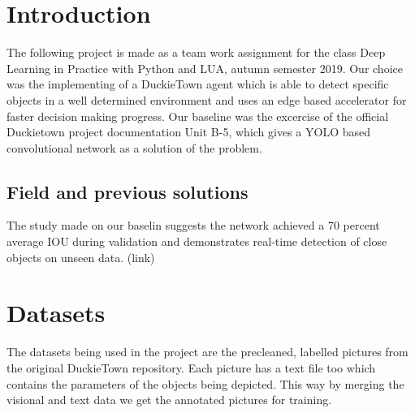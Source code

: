 \documentclass{article}
\begin{document}
\section{Introduction}
The following project is made as a team work assignment for the class Deep Learning in Practice with Python and LUA, autumn semester 2019. Our choice was the implementing of a DuckieTown agent which is able to detect specific objects in a well determined environment and uses an edge based accelerator for faster decision making progress. 
Our baseline was the excercise of the official Duckietown project documentation Unit B-5, which gives a YOLO based convolutional network as a solution of the problem.  

\subsection{Field and previous solutions}
The study made on our baselin suggests the network achieved a 70 percent average IOU during validation and demonstrates real-time detection of close objects on unseen data. (link)  

\section{Datasets}
The datasets being used in the project are the precleaned, labelled pictures from the original DuckieTown repository. Each picture has a text file too which contains the parameters of the objects being depicted. This way by merging the visional and text data we get the annotated pictures for training.
\end{document}
